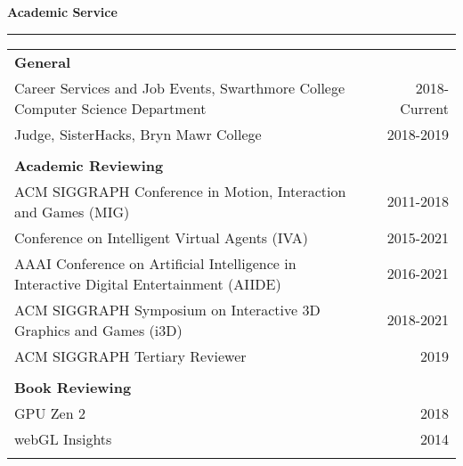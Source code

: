 \needspace{6em}
{\large {\bf Academic Service}}
\vspace{0.1cm}
\hrule
\begin{tabular*}{7.1in}{@{}l@{\extracolsep\fill}r}

{\bf General } & \\
Career Services and Job Events, Swarthmore College Computer Science Department & 2018-Current \\
Judge, SisterHacks, Bryn Mawr College & 2018-2019 \\
\phantom{yommomma} & \phantom{2002}\\

{\bf Academic Reviewing } & \\
ACM SIGGRAPH Conference in Motion, Interaction and Games (MIG) & 2011-2018 \\
Conference on Intelligent Virtual Agents (IVA) & 2015-2021\\
AAAI Conference on Artificial Intelligence in Interactive Digital Entertainment (AIIDE) & 2016-2021 \\
ACM SIGGRAPH Symposium on Interactive 3D Graphics and Games (i3D) & 2018-2021 \\
ACM SIGGRAPH Tertiary Reviewer & 2019 \\
\phantom{yommomma} & \phantom{2002}\\

{\bf Book Reviewing } & \\
GPU Zen 2 & 2018 \\
webGL Insights & 2014 \\
\phantom{yommomma} & \phantom{2002}\\
\end{tabular*}


